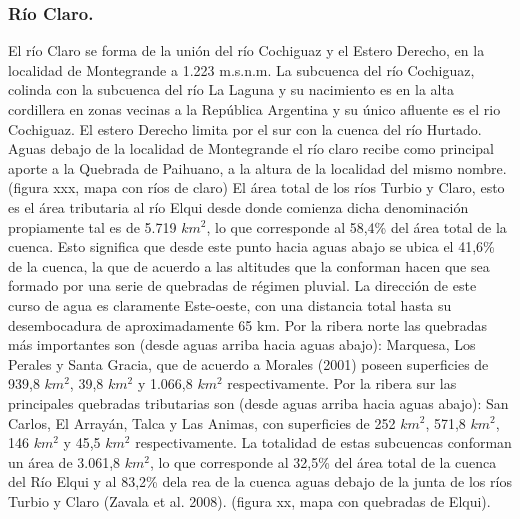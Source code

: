 \documentclass[11pt,]{article}
\begin{document}
\subsubsection{Río Claro.}
El río Claro se forma de la unión del río Cochiguaz y el Estero Derecho, en la localidad de Montegrande a 1.223 m.s.n.m. La subcuenca del río Cochiguaz, colinda con la subcuenca del río La Laguna y su nacimiento es en la alta cordillera en zonas vecinas a la República Argentina y su único afluente es el rio Cochiguaz. El estero Derecho limita por el sur con la cuenca del río Hurtado. Aguas debajo de la localidad de Montegrande el río claro recibe como principal aporte a la Quebrada de Paihuano, a la altura de la localidad del mismo nombre. (figura xxx, mapa con ríos de claro)
El área total de los ríos Turbio y Claro, esto es el área tributaria  al río Elqui desde donde comienza dicha denominación propiamente tal es de 5.719 $km^2$, lo que corresponde al 58,4\% del  área total de la cuenca. Esto significa que desde este punto hacia aguas abajo se ubica el 41,6\% de la cuenca, la que de acuerdo a las altitudes que la conforman hacen que sea formado por una serie de quebradas de régimen pluvial. La dirección de este curso de agua es claramente Este-oeste, con una distancia total hasta su desembocadura de aproximadamente 65 km. Por la ribera norte las quebradas más importantes son (desde aguas arriba hacia aguas abajo): Marquesa, Los Perales y Santa Gracia, que de acuerdo a Morales (2001) poseen superficies de 939,8 $km^2$, 39,8 $km^2$ y 1.066,8 $km^2$ respectivamente. Por la ribera sur las principales quebradas tributarias son (desde aguas arriba hacia aguas abajo): San Carlos, El Arrayán, Talca y Las Animas, con superficies de 252 $km^2$, 571,8 $km^2$, 146 $km^2$ y 45,5 $km^2$ respectivamente. La totalidad de estas subcuencas conforman un área de 3.061,8 $km^2$, lo que corresponde al 32,5\% del área total de la cuenca del Río Elqui y al 83,2\% dela rea de la cuenca aguas debajo de la junta de los ríos Turbio y Claro (Zavala et al. 2008). (figura xx, mapa con quebradas de Elqui).
\end{document}
